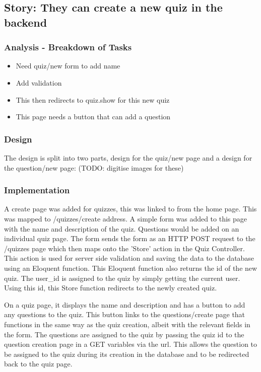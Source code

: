 \subsection{Story: They can create a new quiz in the backend}
\subsubsection{Analysis - Breakdown of Tasks}
\begin{itemize}
	\item Need quiz/new form to add name
	\item Add validation
	\item This then redirects to quiz.show for this new quiz
	\item This page needs a button that can add a question
\end{itemize}
\subsubsection{Design}
The design is split into two parts, design for the quiz/new page and a design for the question/new page:
(TODO: digitise images for these)
\subsubsection{Implementation}
A create page was added for quizzes, this was linked to from the home page. This was mapped to /quizzes/create address. A simple form was added to this page with the name and description of the quiz. Questions would be added on an individual quiz page. The form sends the form as an HTTP POST request to the /quizzes page which then maps onto the 'Store' action in the Quiz Controller. This action is used for server side validation and saving the data to the database using an Eloquent function. This Eloquent function also returns the id of the new quiz. The user\_id is assigned to the quiz by simply getting the current user. Using this id, this Store function redirects to the newly created quiz.

On a quiz page, it displays the name and description and has a button to add any questions to the quiz. This button links to the questions/create page that functions in the same way as the quiz creation, albeit with the relevant fields in the form. The questions are assigned to the quiz by passing the quiz id to the question creation page in a GET variables via the url. This allows the question to be assigned to the quiz during its creation in the database and to be redirected back to the quiz page.


